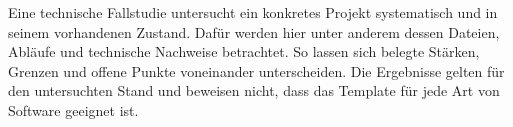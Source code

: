 \begin{beginnerstatement}

Eine technische Fallstudie untersucht ein konkretes Projekt systematisch und
in seinem vorhandenen Zustand. Dafür werden hier unter anderem dessen Dateien,
Abläufe und technische Nachweise betrachtet. So lassen sich belegte Stärken,
Grenzen und offene Punkte voneinander unterscheiden. Die Ergebnisse gelten für
den untersuchten Stand und beweisen nicht, dass das Template für jede Art von
Software geeignet ist.

\end{beginnerstatement}
